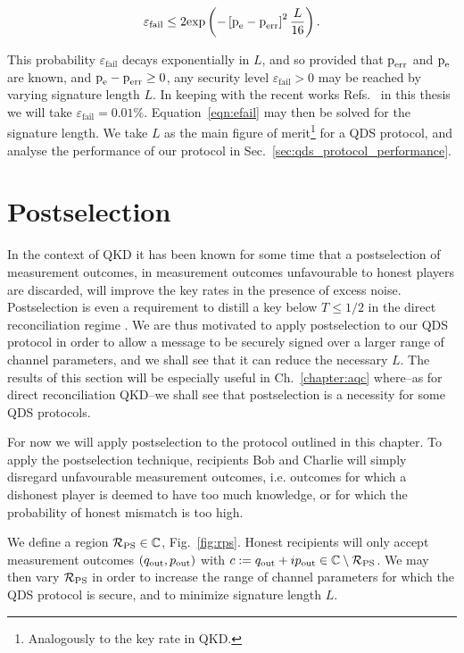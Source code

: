 \begin{equation}\label{eqn:efail}
\varepsilon_{\text{fail}} \le 2 \text{exp}\left( - \left[\text{p}_{\text{e}} - \text{p}_{\text{err}}\right]^2 \frac{L}{16}\right).
\end{equation}

\noindent This probability $\varepsilon_{\text{fail}}$ decays exponentially in $L$, and so provided that $\text{p}_{\text{err}}$ and $\text{p}_{\text{e}}$ are known, and $\text{p}_{\text{e}} - \text{p}_{\text{err}} \ge 0$, any security level $\varepsilon_{\text{fail}} > 0 $ may be reached by varying signature length $L$. In keeping with the recent works Refs.~\cite{Collins2014, Croal2016, Donaldson2016, Amiri2016} in this thesis we will take $\varepsilon_{\text{fail}} = 0.01\%$. Equation~\ref{eqn:efail} may then be solved for the signature length. We take $L$ as the main figure of merit\footnote{Analogously to the key rate in QKD.} for a QDS protocol, and analyse the performance of our protocol in Sec.~\ref{sec:qds_protocol_performance}.



\section{Postselection}
In the context of QKD it has been known for some time that a postselection of measurement outcomes, in measurement outcomes unfavourable to honest players are discarded, will improve the key rates in the presence of excess noise. Postselection is even a requirement to distill a key below $T \le 1/2$ in the direct reconciliation regime \cite{Silberhorn2002}. We are thus motivated to apply postselection to our QDS protocol in order to allow a message to be securely signed over a larger range of channel parameters, and we shall see that it can reduce the necessary $L$. The results of this section will be especially useful in Ch.~\ref{chapter:aqc} where--as for direct reconciliation QKD--we shall see that postselection is a necessity for some QDS protocols.

For now we will apply postselection to the protocol outlined in this chapter. To apply the postselection technique, recipients Bob and Charlie will simply disregard unfavourable measurement outcomes, i.e. outcomes for which a dishonest player is deemed to have too much knowledge, or for which the probability of honest mismatch is too high.

We define a region $\mathcal{R}_{\text{PS}} \in \mathbb{C}$, Fig.~\ref{fig:rps}. Honest recipients will only accept measurement outcomes $\left(q_{\text{out}}, p_{\text{out}}\right)$ with $c := q_{\text{out}} + i p_{\text{out}} \in \mathbb{C}\setminus\mathcal{R}_{\text{PS}}$. We may then vary $\mathcal{R}_{\text{PS}}$ in order to increase the range of channel parameters for which the QDS protocol is secure, and to minimize signature length $L$.

